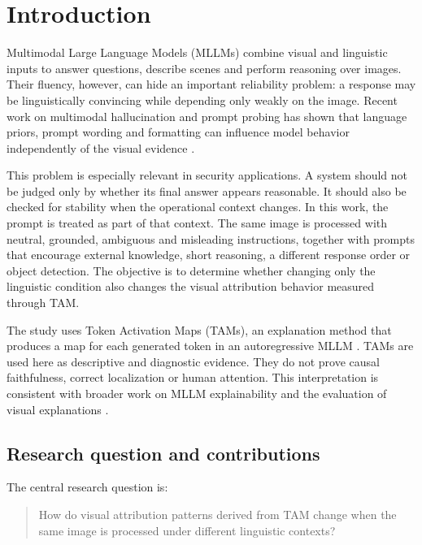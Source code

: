 \documentclass[11pt,a4paper]{article}
\begin{document}
\tableofcontents
\clearpage
{}

\section{Introduction}

Multimodal Large Language Models (MLLMs) combine visual and linguistic inputs to answer questions, describe scenes and perform reasoning over images. Their fluency, however, can hide an important reliability problem: a response may be linguistically convincing while depending only weakly on the image. Recent work on multimodal hallucination and prompt probing has shown that language priors, prompt wording and formatting can influence model behavior independently of the visual evidence \cite{favero2024hallucination,qi2023promptprobing,ismithdeen2025promptception}.

This problem is especially relevant in security applications. A system should not be judged only by whether its final answer appears reasonable. It should also be checked for stability when the operational context changes. In this work, the prompt is treated as part of that context. The same image is processed with neutral, grounded, ambiguous and misleading instructions, together with prompts that encourage external knowledge, short reasoning, a different response order or object detection. The objective is to determine whether changing only the linguistic condition also changes the visual attribution behavior measured through TAM.

The study uses Token Activation Maps (TAMs), an explanation method that produces a map for each generated token in an autoregressive MLLM \cite{li2025tam}. TAMs are used here as descriptive and diagnostic evidence. They do not prove causal faithfulness, correct localization or human attention. This interpretation is consistent with broader work on MLLM explainability and the evaluation of visual explanations \cite{dang2024survey,zhang2025saliencybench}.

\subsection{Research question and contributions}

The central research question is:

\begin{quote}
How do visual attribution patterns derived from TAM change when the same image is processed under different linguistic contexts?
\end{quote}
\end{document}
